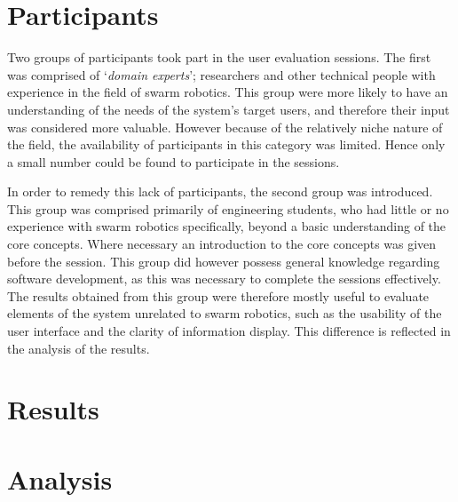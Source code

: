 
\section{Participants}

Two groups of participants took part in the user evaluation sessions. The first was comprised of `\textit{domain experts}'; researchers and other technical people with experience in the field of swarm robotics. This group were more likely to have an understanding of the needs of the system's target users, and therefore their input was considered more valuable. However because of the relatively niche nature of the field, the availability of participants in this category was limited. Hence only a small number could be found to participate in the sessions.

In order to remedy this lack of participants, the second group was introduced. This group was comprised primarily of engineering students, who had little or no experience with swarm robotics specifically, beyond a basic understanding of the core concepts. Where necessary an introduction to the core concepts was given before the session. This group did however possess general knowledge regarding software development, as this was necessary to complete the sessions effectively. The results obtained from this group were therefore mostly useful to evaluate elements of the system unrelated to swarm robotics, such as the usability of the user interface and the clarity of information display. This difference is reflected in the analysis of the results.


\section{Results}





\section{Analysis}




